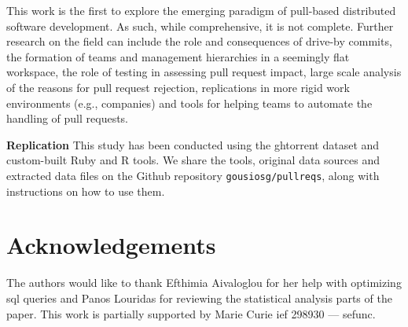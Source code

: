 \documentclass{sig-alternate}
\begin{document}
This work is the first to explore the emerging paradigm of pull-based
distributed software development. As such, while comprehensive, it is not complete.
Further research on the field can include the role and consequences of drive-by
commits, the formation of teams and management hierarchies in a seemingly flat
workspace, the role of testing in assessing pull request impact, large scale
analysis of the reasons for pull request rejection,
replications in more rigid work environments (e.g., companies) and tools for
helping teams to automate the handling of pull requests.

{\bfseries Replication} This study has been conducted using the {\sc ght}orrent
dataset and custom-built Ruby and R tools. We share the tools, original data
sources and extracted data files on the Github repository
\texttt{gousiosg\-/\-pullreqs}, along with instructions on how to use them.

\section*{Acknowledgements}

The authors would like to thank Efthimia Aivaloglou for her help with 
optimizing {\sc sql} queries and Panos Louridas for reviewing the 
statistical analysis parts of the paper.
This work is partially supported by Marie Curie {\sc ief} 298930 --- {\sc sefunc}.


\balance
\begin{small}
  
\end{small}
\end{document}
